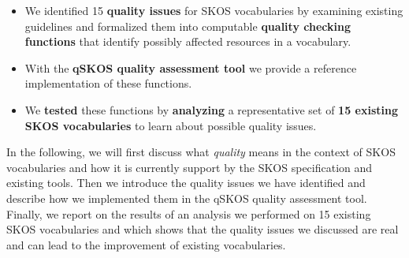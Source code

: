 \begin{itemize}

	\item We identified 15 \textbf{quality issues} for SKOS vocabularies by examining existing guidelines and formalized them into computable \textbf{quality checking functions} that identify possibly affected resources in a vocabulary.
	
	\item With the \textbf{qSKOS quality assessment tool} we provide a reference implementation of these functions.

	\item We \textbf{tested} these functions by \textbf{analyzing} a representative set of \textbf{15 existing SKOS vocabularies} to learn about possible quality issues.

\end{itemize}

In the following, we will first discuss what \emph{quality} means in the context of SKOS vocabularies and how it is currently support by the SKOS specification and existing tools. Then we introduce the quality issues we have identified and describe how we implemented them in the qSKOS quality assessment tool. Finally, we report on the results of an analysis we performed on 15 existing SKOS vocabularies and which shows that the quality issues we discussed are real and can lead to the improvement of existing vocabularies.